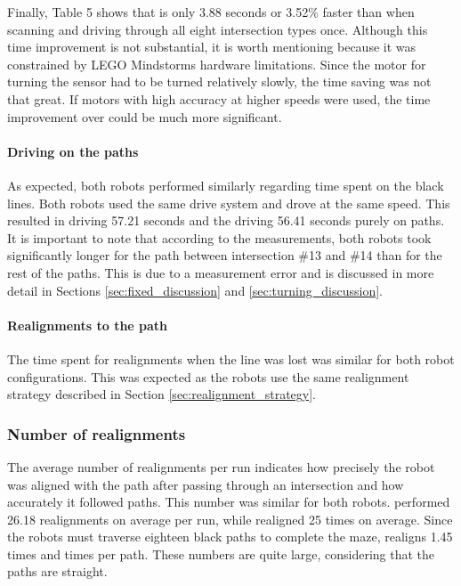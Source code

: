 Finally, Table 5 shows that \TurnRob is only 3.88 seconds or 3.52\%  faster than \FixRob when scanning and driving through all eight intersection types once. Although this time improvement is not substantial, it is worth mentioning because it was constrained by LEGO Mindstorms hardware limitations. Since the motor for turning the sensor had to be turned relatively slowly, the time saving was not that great. If motors with high accuracy at higher speeds were used, the time improvement over \FixRob could be much more significant.


\paragraph{Driving on the paths}
As expected, both robots performed similarly regarding time spent on the black lines. Both robots used the same drive system and drove at the same speed. This resulted in \FixRob driving 57.21 seconds and the \TurnRob driving 56.41 seconds purely on paths. It is important to note that according to the measurements, both robots took significantly longer for the path between intersection \#13 and \#14 than for the rest of the paths. This is due to a measurement error and is discussed in more detail in Sections \ref{sec:fixed_discussion} and \ref{sec:turning_discussion}.

\paragraph{Realignments to the path}
The time spent for realignments when the line was lost was similar for both robot configurations. This was expected as the robots use the same realignment strategy described in Section \ref{sec:realignment_strategy}.

\subsubsection{Number of realignments}
The average number of realignments per run indicates how precisely the robot was aligned with the path after passing through an intersection and how accurately it followed paths. This number was similar for both robots. \FixRob performed 26.18 realignments on average per run, while \TurnRob realigned 25 times on average. Since the robots must traverse eighteen black paths to complete the maze, \FixRob realigns 1.45 times and  times per path. These numbers are quite large, considering that the paths are straight.

